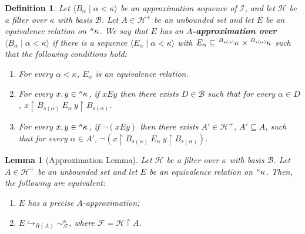 \documentclass[10pt,a4paper]{amsart}
\newtheorem{definition}{Definition}
\newtheorem{lemma}{Lemma}
\renewcommand{\k}{\kappa}
\newcommand{\markdef}[1]{\textbf{#1}}
\newcommand{\pre}[2]{\tensor[^{#1}]{#2}{}}
\newcommand{\seq}[2]{\langle #1 \mid #2 \rangle}
\begin{document}
\begin{definition}\label{A-approximationk}
    Let \(\seq{B_\alpha}{\alpha<\kappa}\) be an approximation sequence of $\mathcal{I}$, and let  $\mathcal{H}$ be a filter over $\kappa$ with basis $\mathcal{B}$. Let $A\in \mathcal{H}^+$ be an unbounded set and let $E$ be an equivalence relation on $\pre{\k}{\kappa}$.
    We say that $E$ has an \markdef{$A$-approximation over $\seq{B_\alpha}{\alpha<\kappa}$} if there is  a sequence $\langle E_\alpha\mid \alpha<\kappa\rangle$ with $E_\alpha\subseteq \pre{B_{s(\alpha)}}{\k}\times \pre{B_{s(\alpha)}}{\k}$ such that the following conditions hold:
    \begin{enumerate}[label={\upshape (\arabic*)}, leftmargin=2pc]
        \item For every $ \alpha<\kappa$, $E_\alpha$ is an equivalence relation.
        \item\label{A-approximationk_2} For every $x,y\in \pre{\k}{\kappa}$, if $x E y$ then there exists $D\in \mathcal{B}$ such that for every $\alpha\in D$, $x\restriction B_{s(\alpha)} \ E_\alpha\ y\restriction B_{s(\alpha)}$.
        \item\label{A-approximationk_3} For every $x,y\in \pre{\k}{\kappa}$, if $\neg (x E y)$ then there exists $A'\in \mathcal{H}^+$, $A'\subseteq A$, such that for every $\alpha\in A'$, $\neg(x\restriction B_{s(\alpha)} \ E_\alpha\ y\restriction B_{s(\alpha)})$.
    \end{enumerate}
\end{definition}

\begin{lemma}[Approximation Lemma]\label{approx_lemma}
    Let $\mathcal{H}$ be a filter over $\kappa$ with basis $\mathcal{B}$. Let $A\in \mathcal{H}^+$ be an unbounded set and let $E$ be an equivalence relation on $\pre{\k}{\kappa}$. Then, the following are equivalent:
    \begin{enumerate}[label={\upshape (\arabic*)}, leftmargin=2pc]
        \item\label{approx1} $E$ has a precise $A$-approximation;
        \item\label{approx2} $E\hookrightarrow_{R(A)}\sim^\kappa_\mathcal{F}$, where $\mathcal{F}=\mathcal{H}\restriction A$.
\end{enumerate}
\end{lemma}
\end{document}
